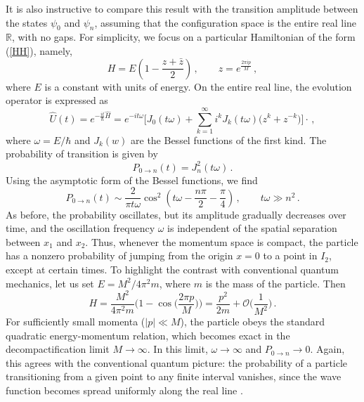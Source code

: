 \documentclass[12pt,a4paper]{article}
\numberwithin{equation}{section}
\theoremstyle{theorem}
\theoremstyle{remark}
\begin{document}
It is also instructive to compare this result with the transition amplitude between the states $\psi_0$ and $\psi_n$, assuming that the configuration space is the entire real line $\mathbb{R}$, with no gaps. For simplicity, we focus on a particular Hamiltonian of the form (\ref{HH}), namely,  
\begin{equation}
    H=E\left(1- \frac{z+\bar z}2\right)\,,\qquad z=e^{\frac{2\pi i p}{M}}\,,
\end{equation}
where $E$ is  a constant with units of energy. On the entire real line, the evolution operator is expressed as 
\begin{equation}
    \hat U(t)=e^{-\frac{it}{\hbar}\hat H} =e^{-it\omega}\Big[J_0(t\omega)+\sum_{k=1}^\infty i^kJ_k(t\omega)\big( {z^k}+
    {z^{-k}}\big)\Big]\cdot \,,
\end{equation}
where $\omega=E/\hbar$ and $J_k(w)$ are the Bessel functions of the first kind. The probability of transition is given by 
\begin{equation}
    P_{0\rightarrow n}(t)=J^2_n(t\omega)\,.
    \end{equation}
Using the asymptotic form of the Bessel functions, we find 
\begin{equation}
    P_{0\rightarrow n}(t)\sim \frac{2}{\pi t\omega}\cos^2 \left( t\omega-\frac{n\pi}{2}-\frac{\pi}{4} \right)\,,\qquad t\omega \gg n^2\,.
\end{equation}
As before, the probability oscillates, but its amplitude gradually decreases over time, and the oscillation frequency $\omega$ is independent of the spatial separation between $x_1$ and $x_2$. Thus, whenever the momentum space is compact, the particle has a nonzero probability of jumping from the origin $x=0$ to a point in $I_2$, except at certain times. 
To highlight the contrast with conventional quantum mechanics, let us set $E=M^2/4\pi^2 m$, where $m$ is the mass of the particle.  Then 
\begin{equation}\label{FP}
H=\frac{M^2}{4\pi^2m}\Big(1-\cos\Big(\frac{2\pi p}{M}\Big)\Big )=\frac{p^2}{2m}+\mathcal{O}\Big(\frac{1}{M^2}\Big)\,.
\end{equation}
For sufficiently small momenta ($|p|\ll M$), the particle obeys the standard quadratic energy-momentum relation, which becomes exact in the decompactification limit $M\rightarrow \infty$. In this limit, $\omega\rightarrow \infty$ and $P_{0\rightarrow n}\rightarrow 0$. Again, this agrees with the conventional quantum picture: the probability of a particle transitioning from a given point to any finite interval vanishes, since the wave function  becomes spread uniformly along the real line \cite{hegerfeldt1998instantaneous}. 
\end{document}
